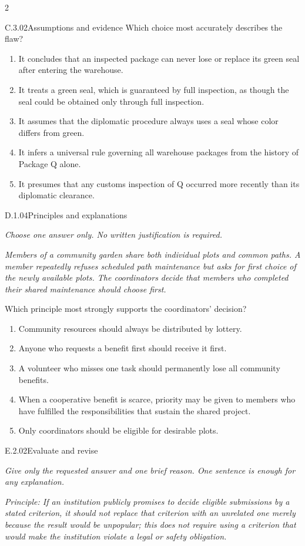 \documentclass[9pt]{extarticle}
\newcommand{\choice}[1]{\item #1}
\begin{document}
\begin{multicols}{2}
\begin{DenseCoreProblem}{C.3.02}{Assumptions and evidence}
Which choice most accurately describes the flaw?
\begin{enumerate}[label=(\alph*)]
  \choice{It concludes that an inspected package can never lose or replace its green seal after entering the warehouse.}
  \choice{It treats a green seal, which is guaranteed by full inspection, as though the seal could be obtained only through full inspection.}
  \choice{It assumes that the diplomatic procedure always uses a seal whose color differs from green.}
  \choice{It infers a universal rule governing all warehouse packages from the history of Package Q alone.}
  \choice{It presumes that any customs inspection of Q occurred more recently than its diplomatic clearance.}
\end{enumerate}
\end{DenseCoreProblem}
\begin{DenseCoreProblem}{D.1.04}{Principles and explanations}
{\scriptsize\textit{Choose one answer only. No written justification is required.}\par}
\emph{Members of a community garden share both individual plots and common paths. A member repeatedly refuses scheduled path maintenance but asks for first choice of the newly available plots. The coordinators decide that members who completed their shared maintenance should choose first.}

Which principle most strongly supports the coordinators' decision?
\begin{enumerate}[label=(\alph*)]
  \choice{Community resources should always be distributed by lottery.}
  \choice{Anyone who requests a benefit first should receive it first.}
  \choice{A volunteer who misses one task should permanently lose all community benefits.}
  \choice{When a cooperative benefit is scarce, priority may be given to members who have fulfilled the responsibilities that sustain the shared project.}
  \choice{Only coordinators should be eligible for desirable plots.}
\end{enumerate}
\end{DenseCoreProblem}
\begin{DenseCoreProblem}{E.2.02}{Evaluate and revise}
{\scriptsize\textit{Give only the requested answer and one brief reason. One sentence is enough for any explanation.}\par}
\emph{Principle: If an institution publicly promises to decide eligible submissions by a stated criterion, it should not replace that criterion with an unrelated one merely because the result would be unpopular; this does not require using a criterion that would make the institution violate a legal or safety obligation.}


\end{DenseCoreProblem}
\end{multicols}
\end{document}
